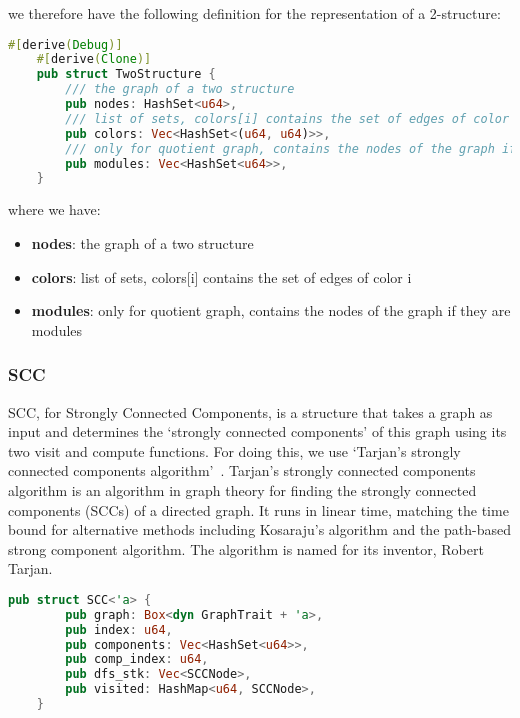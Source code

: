 we therefore have the following definition for the representation of a 2-structure:
\begin{lstlisting}[language=Rust, style=rust, caption={Defining the 2-structure with Rust}, label={lst:rust-define-twostructure}, firstnumber=1]
    #[derive(Debug)]
    #[derive(Clone)]
    pub struct TwoStructure {
        /// the graph of a two structure
        pub nodes: HashSet<u64>,
        /// list of sets, colors[i] contains the set of edges of color i
        pub colors: Vec<HashSet<(u64, u64)>>,
        /// only for quotient graph, contains the nodes of the graph if they are modules
        pub modules: Vec<HashSet<u64>>,
    }
\end{lstlisting}
where we have:
\begin{itemize}
    \item \textbf{nodes}: the graph of a two structure
    \item \textbf{colors}: list of sets, colors[i] contains the set of edges of color i
    \item \textbf{modules}: only for quotient graph, contains the nodes of the graph if they are modules
\end{itemize}

\subsubsection{SCC}

SCC, for Strongly Connected Components, is a structure that takes a graph as input and determines the `strongly connected components' of this graph using its two visit and compute functions.
For doing this, we use `Tarjan's strongly connected components algorithm'~\cite{sccalgowikipedia}.
Tarjan's strongly connected components algorithm is an algorithm in graph theory for finding the strongly connected components (SCCs) of a directed graph.
It runs in linear time, matching the time bound for alternative methods including Kosaraju's algorithm and the path-based strong component algorithm.
The algorithm is named for its inventor, Robert Tarjan.

\begin{lstlisting}[language=Rust, style=rust, caption={Defining the SCC with Rust}, label={lst:rust-define-scc}, firstnumber=1]
    pub struct SCC<'a> {
        pub graph: Box<dyn GraphTrait + 'a>,
        pub index: u64,
        pub components: Vec<HashSet<u64>>,
        pub comp_index: u64,
        pub dfs_stk: Vec<SCCNode>,
        pub visited: HashMap<u64, SCCNode>,
    }
\end{lstlisting}

